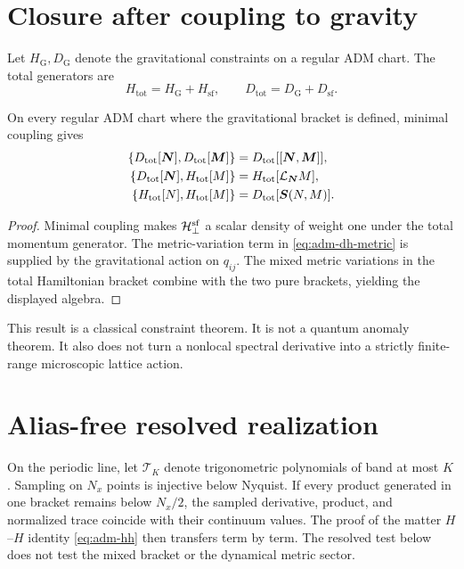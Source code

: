 \section{Closure after coupling to gravity}

Let $H_{\mathrm G},D_{\mathrm G}$ denote the gravitational constraints on a regular ADM chart.  The total generators are
\begin{equation}
H_{\mathrm{tot}}=H_{\mathrm G}+H_{\mathrm{sf}},
\qquad
D_{\mathrm{tot}}=D_{\mathrm G}+D_{\mathrm{sf}}.
\end{equation}
\begin{theorem}
On every regular ADM chart where the gravitational bracket is defined, minimal coupling gives
\begin{align}
\left\{D_{\mathrm{tot}}[\bm N],D_{\mathrm{tot}}[\bm M]\right\}
&=D_{\mathrm{tot}}[[\bm N,\bm M]],
\label{eq:adm-total-dd}\\
\left\{D_{\mathrm{tot}}[\bm N],H_{\mathrm{tot}}[M]\right\}
&=H_{\mathrm{tot}}[\mathcal L_{\bm N}M],
\label{eq:adm-total-dh}\\
\left\{H_{\mathrm{tot}}[N],H_{\mathrm{tot}}[M]\right\}
&=D_{\mathrm{tot}}[\bm S(N,M)].
\label{eq:adm-total-hh}
\end{align}
\end{theorem}

\begin{proof}
Minimal coupling makes $\mathcal H_\perp^{\mathrm{sf}}$ a scalar density of weight one under the total momentum generator.  The metric-variation term in \eqref{eq:adm-dh-metric} is supplied by the gravitational action on $q_{ij}$.  The mixed metric variations in the total Hamiltonian bracket combine with the two pure brackets, yielding the displayed algebra.
\end{proof}

\begin{statusbox}
This result is a classical constraint theorem.  It is not a quantum anomaly theorem.  It also does not turn a nonlocal spectral derivative into a strictly finite-range microscopic lattice action.
\end{statusbox}

\section{Alias-free resolved realization}

On the periodic line, let $\mathcal T_K$ denote trigonometric polynomials of band at most $K$.  Sampling on $N_x$ points is injective below Nyquist.  If every product generated in one bracket remains below $N_x/2$, the sampled derivative, product, and normalized trace coincide with their continuum values.  The proof of the matter $H$--$H$ identity \eqref{eq:adm-hh} then transfers term by term.  The resolved test below does not test the mixed bracket or the dynamical metric sector.

